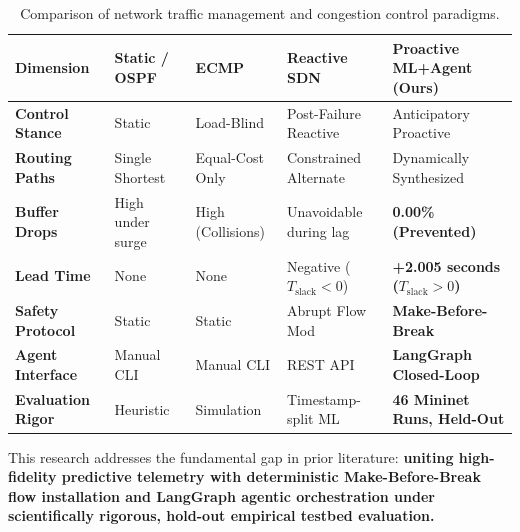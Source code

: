 \begin{table}[H]
  \centering
  \small
  \caption{Comparison of network traffic management and congestion control paradigms.}
  \label{tab:lit_comparison}
  \begin{tabularx}{\textwidth}{l p{2.8cm} p{2.8cm} p{2.8cm} X}
    \toprule
    \textbf{Dimension} & \textbf{Static / OSPF} & \textbf{ECMP} & \textbf{Reactive SDN} & \textbf{Proactive ML+Agent (Ours)} \\
    \midrule
    \textbf{Control Stance} & Static & Load-Blind & Post-Failure Reactive & Anticipatory Proactive \\
    \textbf{Routing Paths} & Single Shortest & Equal-Cost Only & Constrained Alternate & Dynamically Synthesized \\
    \textbf{Buffer Drops} & High under surge & High (Collisions) & Unavoidable during lag & \textbf{0.00\% (Prevented)} \\
    \textbf{Lead Time} & None & None & Negative ($T_{\text{slack}} < 0$) & \textbf{+2.005 seconds ($T_{\text{slack}} > 0$)} \\
    \textbf{Safety Protocol} & Static & Static & Abrupt Flow Mod & \textbf{Make-Before-Break} \\
    \textbf{Agent Interface} & Manual CLI & Manual CLI & REST API & \textbf{LangGraph Closed-Loop} \\
    \textbf{Evaluation Rigor} & Heuristic & Simulation & Timestamp-split ML & \textbf{46 Mininet Runs, Held-Out} \\
    \bottomrule
  \end{tabularx}
\end{table}

This research addresses the fundamental gap in prior literature: \textbf{uniting high-fidelity predictive telemetry with deterministic Make-Before-Break flow installation and LangGraph agentic orchestration under scientifically rigorous, hold-out empirical testbed evaluation.}
